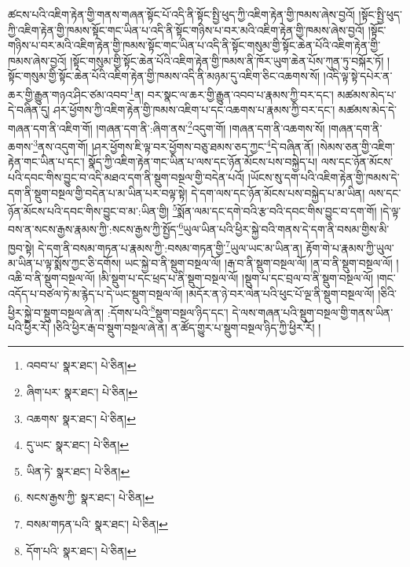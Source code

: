 ཚངས་པའི་འཇིག་རྟེན་གྱི་གནས་གཞན་སྟོང་པོ་འདི་ནི་སྟོང་སྤྱི་ཕུད་ཀྱི་འཇིག་རྟེན་གྱི་ཁམས་ཞེས་བྱའོ། །སྟོང་སྤྱི་ཕུད་ཀྱི་འཇིག་རྟེན་གྱི་ཁམས་སྟོང་གང་ཡིན་པ་འདི་ནི་སྟོང་གཉིས་པ་བར་མའི་འཇིག་རྟེན་གྱི་ཁམས་ཞེས་བྱའོ། །སྟོང་གཉིས་པ་བར་མའི་འཇིག་རྟེན་གྱི་ཁམས་སྟོང་གང་ཡིན་པ་འདི་ནི་སྟོང་གསུམ་གྱི་སྟོང་ཆེན་པོའི་འཇིག་རྟེན་གྱི་ཁམས་ཞེས་བྱའོ། །སྟོང་གསུམ་གྱི་སྟོང་ཆེན་པོའི་འཇིག་རྟེན་གྱི་ཁམས་ནི་ཁོར་ཡུག་ཆེན་པོས་ཀུན་ཏུ་བསྐོར་ཏོ། །སྟོང་གསུམ་གྱི་སྟོང་ཆེན་པོའི་འཇིག་རྟེན་གྱི་ཁམས་འདི་ནི་མཉམ་དུ་འཇིག་ཅིང་འཆགས་སོ། །འདི་ལྟ་སྟེ་དཔེར་ན་ཆར་གྱི་རྒྱུན་གཉའ་ཤིང་ཙམ་འབབ་\footnote{འབབ་པ་  སྣར་ཐང་།  པེ་ཅིན། }ན། བར་སྣང་ལ་ཆར་གྱི་རྒྱུན་འབབ་པ་རྣམས་ཀྱི་བར་དང་། མཚམས་མེད་པ་དེ་བཞིན་དུ། ཤར་ཕྱོགས་ཀྱི་འཇིག་རྟེན་གྱི་ཁམས་འཇིག་པ་དང་འཆགས་པ་རྣམས་ཀྱི་བར་དང་། མཚམས་མེད་དེ་གཞན་དག་ནི་འཇིག་གོ། །གཞན་དག་ནི་:ཞིག་ནས་\footnote{ཞིག་པར་  སྣར་ཐང་།  པེ་ཅིན། }འདུག་གོ། །གཞན་དག་ནི་འཆགས་སོ། །གཞན་དག་ནི་ཆགས་\footnote{འཆགས་  སྣར་ཐང་།  པེ་ཅིན། }ནས་འདུག་གོ། །ཤར་ཕྱོགས་ཇི་ལྟ་བར་ཕྱོགས་བཅུ་ཐམས་ཅད་ཀྱང་\footnote{དུ་ཡང་  སྣར་ཐང་།  པེ་ཅིན། }དེ་བཞིན་ནོ། །སེམས་ཅན་གྱི་འཇིག་རྟེན་གང་ཡིན་པ་དང་། སྣོད་ཀྱི་འཇིག་རྟེན་གང་ཡིན་པ་ལས་དང་ཉོན་མོངས་པས་བསྐྱེད་པ། ལས་དང་ཉོན་མོངས་པའི་དབང་གིས་བྱུང་བ་འདི་མཐའ་དག་ནི་སྡུག་བསྔལ་གྱི་བདེན་པའོ། །ཡོངས་སུ་དག་པའི་འཇིག་རྟེན་གྱི་ཁམས་དེ་དག་ནི་སྡུག་བསྔལ་གྱི་བདེན་པ་མ་ཡིན་པར་བལྟ་སྟེ། དེ་དག་ལས་དང་ཉོན་མོངས་པས་བསྐྱེད་པ་མ་ཡིན། ལས་དང་ཉོན་མོངས་པའི་དབང་གིས་བྱུང་བ་མ་:ཡིན་གྱི། \footnote{ཡིན་ཏེ་  སྣར་ཐང་།  པེ་ཅིན། }སྨོན་ལམ་དང་དགེ་བའི་རྩ་བའི་དབང་གིས་བྱུང་བ་དག་གོ། །དེ་ལྟ་བས་ན་སངས་རྒྱས་རྣམས་ཀྱི་:སངས་རྒྱས་ཀྱི་སྤྱོད་\footnote{སངས་རྒྱས་ཀྱི་  སྣར་ཐང་།  པེ་ཅིན། }ཡུལ་ཡིན་པའི་ཕྱིར་སྐྱེ་བའི་གནས་དེ་དག་ནི་བསམ་གྱིས་མི་ཁྱབ་སྟེ། དེ་དག་ནི་བསམ་གཏན་པ་རྣམས་ཀྱི་:བསམ་གཏན་གྱི་\footnote{བསམ་གཏན་པའི་  སྣར་ཐང་།  པེ་ཅིན། }ཡུལ་ཡང་མ་ཡིན་ན། རྟོག་གེ་པ་རྣམས་ཀྱི་ཡུལ་མ་ཡིན་པ་ལྟ་སྨོས་ཀྱང་ཅི་དགོས། ཡང་སྐྱེ་བ་ནི་སྡུག་བསྔལ་ལོ། །རྒ་བ་ནི་སྡུག་བསྔལ་ལོ། །ན་བ་ནི་སྡུག་བསྔལ་ལོ། །འཆི་བ་ནི་སྡུག་བསྔལ་ལོ། །མི་སྡུག་པ་དང་ཕྲད་པ་ནི་སྡུག་བསྔལ་ལོ། །སྡུག་པ་དང་བྲལ་བ་ནི་སྡུག་བསྔལ་ལོ། །གང་འདོད་པ་བཙལ་ཏེ་མ་རྙེད་པ་དེ་ཡང་སྡུག་བསྔལ་ལོ། །མདོར་ན་ཉེ་བར་ལེན་པའི་ཕུང་པོ་ལྔ་ནི་སྡུག་བསྔལ་ལོ། །ཅིའི་ཕྱིར་སྐྱེ་བ་སྡུག་བསྔལ་ཞེ་ན། :དོགས་པའི་\footnote{དོག་པའི་  སྣར་ཐང་།  པེ་ཅིན། }སྡུག་བསྔལ་ཉིད་དང་། དེ་ལས་གཞན་པའི་སྡུག་བསྔལ་གྱི་གནས་ཡིན་པའི་ཕྱིར་རོ། །ཅིའི་ཕྱིར་རྒ་བ་སྡུག་བསྔལ་ཞེ་ན། ན་ཚོད་གྱུར་པ་སྡུག་བསྔལ་ཉིད་ཀྱི་ཕྱིར་རོ། །
